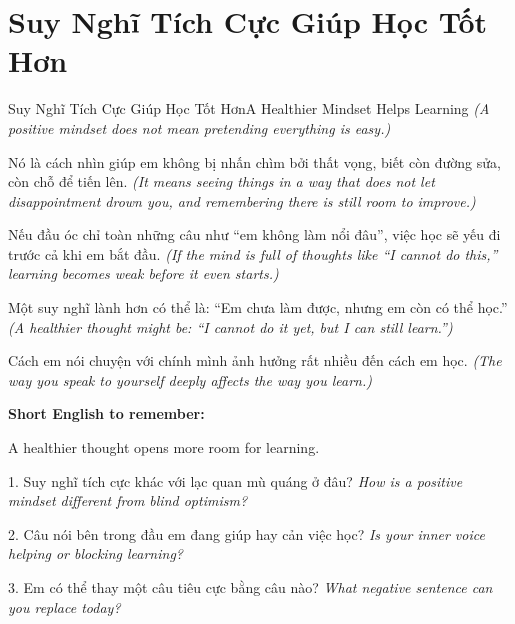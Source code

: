 \section{Suy Nghĩ Tích Cực Giúp Học Tốt Hơn}
\begin{truyen}{Suy Nghĩ Tích Cực Giúp Học Tốt Hơn}{A Healthier Mindset Helps Learning}
\textit{(A positive mindset does not mean pretending everything is easy.)}

Nó là cách nhìn giúp em không bị nhấn chìm bởi thất vọng, biết còn đường sửa, còn chỗ để tiến lên.
\textit{(It means seeing things in a way that does not let disappointment drown you, and remembering there is still room to improve.)}

Nếu đầu óc chỉ toàn những câu như “em không làm nổi đâu”, việc học sẽ yếu đi trước cả khi em bắt đầu.
\textit{(If the mind is full of thoughts like “I cannot do this,” learning becomes weak before it even starts.)}

Một suy nghĩ lành hơn có thể là: “Em chưa làm được, nhưng em còn có thể học.”
\textit{(A healthier thought might be: “I cannot do it yet, but I can still learn.”)}
\end{truyen}

\begin{baihoc}
Cách em nói chuyện với chính mình ảnh hưởng rất nhiều đến cách em học.
\textit{(The way you speak to yourself deeply affects the way you learn.)}
\end{baihoc}

\begin{ghinhoanh}
\textbf{Short English to remember:}

A healthier thought opens more room for learning.

\end{ghinhoanh}

\begin{tuhocnhanh}
1. Suy nghĩ tích cực khác với lạc quan mù quáng ở đâu? \textit{How is a positive mindset different from blind optimism?}

2. Câu nói bên trong đầu em đang giúp hay cản việc học? \textit{Is your inner voice helping or blocking learning?}

3. Em có thể thay một câu tiêu cực bằng câu nào? \textit{What negative sentence can you replace today?}
\end{tuhocnhanh}
\ngancach

